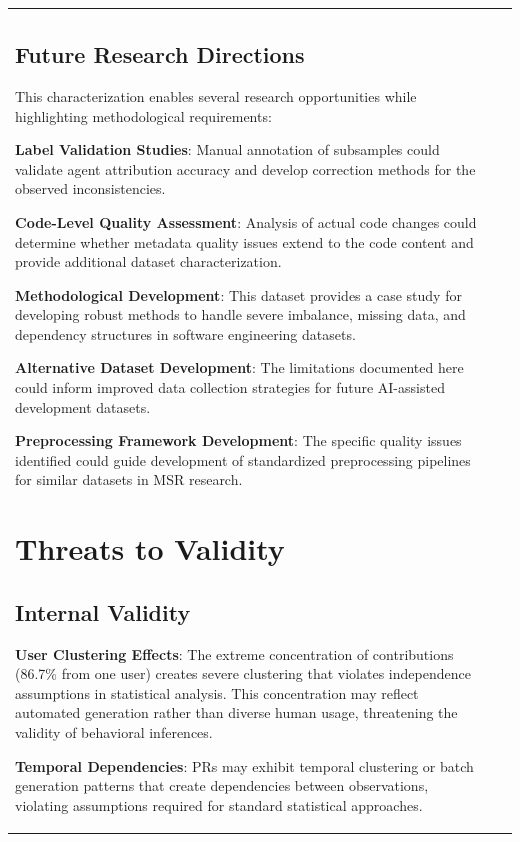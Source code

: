 \documentclass[conference]{IEEEtran}
\begin{document}
\begin{table}[t]
\begin{tabular}{@{}lrr@{}}
\begin{itemize}
\end{itemize}

\subsection{Future Research Directions}

This characterization enables several research opportunities while highlighting methodological requirements:

\textbf{Label Validation Studies}: Manual annotation of subsamples could validate agent attribution accuracy and develop correction methods for the observed inconsistencies.

\textbf{Code-Level Quality Assessment}: Analysis of actual code changes could determine whether metadata quality issues extend to the code content and provide additional dataset characterization.

\textbf{Methodological Development}: This dataset provides a case study for developing robust methods to handle severe imbalance, missing data, and dependency structures in software engineering datasets.

\textbf{Alternative Dataset Development}: The limitations documented here could inform improved data collection strategies for future AI-assisted development datasets.

\textbf{Preprocessing Framework Development}: The specific quality issues identified could guide development of standardized preprocessing pipelines for similar datasets in MSR research.

\section{Threats to Validity}

\subsection{Internal Validity}

\textbf{User Clustering Effects}: The extreme concentration of contributions (86.7\% from one user) creates severe clustering that violates independence assumptions in statistical analysis. This concentration may reflect automated generation rather than diverse human usage, threatening the validity of behavioral inferences.



\textbf{Temporal Dependencies}: PRs may exhibit temporal clustering or batch generation patterns that create dependencies between observations, violating assumptions required for standard statistical approaches.


\end{tabular}
\end{table}
\end{document}
